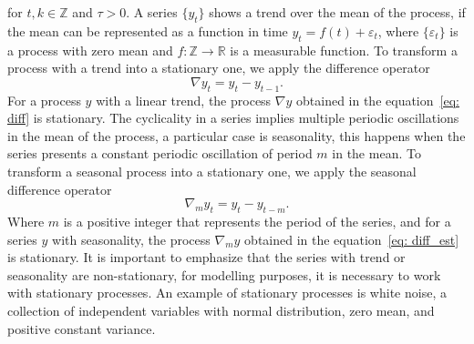 for $t, k \in \mathbb{Z}$ and $\tau> 0$. A series $\{y_t \}$ shows a trend over the mean of the process, if the mean can be represented as a function in time $y_t = f(t) + \varepsilon_t$, where $\{\varepsilon_t \} $ is a process with zero mean and $f:\mathbb{Z} \to \mathbb{R}$ is a measurable function. To transform a process with a trend into a stationary one, we apply the difference operator
%
\begin{equation}\label{eq: diff}
	\nabla y_t=y_t-y_{t-1}.
\end{equation}
%
For a process $y$ with a linear trend, the process $\nabla y $ obtained in the equation~\ref{eq: diff} is stationary. The cyclicality in a series implies multiple periodic oscillations in the mean of the process, a particular case is seasonality, this happens when the series presents a constant periodic oscillation of period $m$ in the mean. To transform a seasonal process into a stationary one, we apply the seasonal difference operator
%
\begin{equation}\label{eq: diff_est}
	\nabla_m y_t=y_t-y_{t-m}.
\end{equation}
%
Where $m$ is a positive integer that represents the period of the series, and for a series $y$ with seasonality, the process $\nabla_m y$ obtained in the equation~\ref{eq: diff_est} is stationary. It is important to emphasize that the series with trend or seasonality are non-stationary, for modelling purposes, it is necessary to work with stationary processes. An example of stationary processes is white noise, a collection of independent variables with normal distribution, zero mean, and positive constant variance.
%
